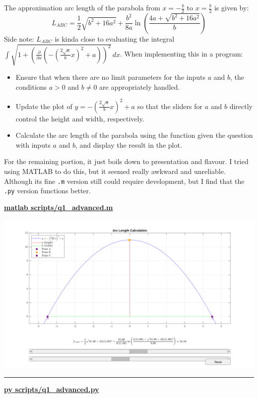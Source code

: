 \documentclass[a4paper, 12pt]{report}
\def\link{blue!50!black}
\begin{document}
    The approximation arc length of the parabola from $x = -\frac{b}{2}$ to $x = \frac{b}{2}$ is given by:
    \[L_{ABC} = \frac{1}{2}\sqrt{b^2 + 16a^2} + \frac{b^2}{8a}\ln\left(\frac{4a + \sqrt{b^2 + 16a^2}}{b}\right)\]
    Side note: $L_{ABC}$ is kinda close to evaluating the integral $\int \sqrt{1 + \left(\frac{\partial}{\partial x}\left(-\left(\frac{2\sqrt{a}}{b}x\right)^2 + a\right)\right)^2} \, dx$. When implementing this in a program:
    \begin{itemize}[itemsep=-0.1cm]
        \item Ensure that when there are no limit parameters for the inputs \(a\) and \(b\), the conditions \(a > 0\) and \(b \neq 0\) are appropriately handled.
        \item Update the plot of \(y = -\left(\frac{2\sqrt{a}}{b}x\right)^2 + a\) so that the sliders for \(a\) and \(b\) directly control the height and width, respectively.
        \item Calculate the arc length of the parabola using the function given the question with inputs \(a\) and \(b\), and display the result in the plot.
    \end{itemize}
    \raggedright
    
    For the remaining portion, it just boils down to presentation and flavour. I tried using MATLAB to do this, but it seemed really awkward and unreliable. Although its fine \texttt{.m} version still could require development, but I find that the \texttt{.py} version functions better.

    \newpage
    
    \centering
    
    \href{https://github.com/sakx7/mathcompuni/blob/main/matlab scripts/q1_advanced.m}{\textcolor{\link}{\textbf{matlab scripts/q1\_advanced.m}}}
   
    
    \includegraphics[width=1\textwidth]{images/rmatFigure_1.png}\\
    \vspace{2em}    
    \hrule
    \vspace{3em}
    \href{https://github.com/sakx7/mathcompuni/blob/main/py scripts/q1_advanced.py}{\textcolor{\link}{\textbf{py scripts/q1\_advanced.py}}}
    
\end{document}
